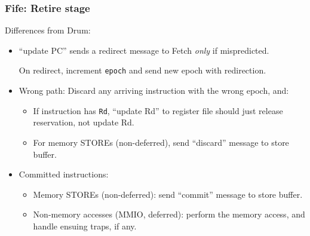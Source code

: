 \begin{frame}[fragile]
\frametitle{Fife: Retire stage}

\footnotesize

Differences from Drum:

\vspace{2ex}

\begin{itemize}

 \item ``update PC'' sends a redirect message to Fetch \emph{only} if
       mispredicted.

       On redirect, increment \verb|epoch| and send new epoch with
       redirection.

 \vspace{2ex}

 \item Wrong path: Discard any arriving instruction with the wrong epoch, and:

       \begin{itemize}

        \item If instruction has \verb|Rd|, ``update Rd'' to
              register file should just release reservation, not update Rd.

        \item For memory STOREs (non-deferred), send ``discard''
              message to store buffer.

       \end{itemize}

 \vspace{2ex}

 \item Committed instructions:

       \begin{itemize}

         \item Memory STOREs (non-deferred): send ``commit'' message
               to store buffer.

         \item Non-memory accesses (MMIO, deferred): perform the
               memory access, and handle ensuing traps, if any.

       \end{itemize}

\end{itemize}

\end{frame}






